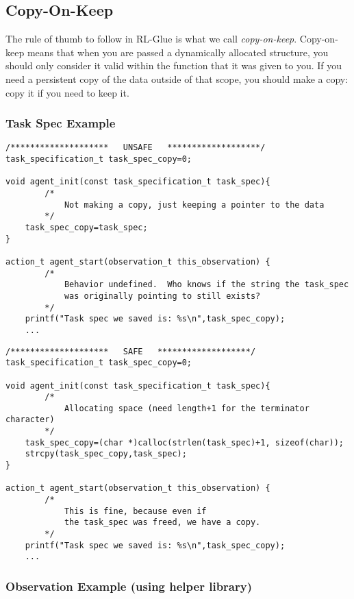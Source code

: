 \documentclass[11pt]{article}
\begin{document}
\subsection{Copy-On-Keep}
The rule of thumb to follow in RL-Glue is what we call \textit{copy-on-keep}.  Copy-on-keep means that when you are passed a dynamically allocated structure, you should
only consider it valid within the function that it was given to you.  If you need a persistent copy of the data outside of that scope, you should make a copy: copy it if you
need to keep it.

\subsubsection{Task Spec Example}
\begin{verbatim}
/********************   UNSAFE   *******************/
task_specification_t task_spec_copy=0;
	
void agent_init(const task_specification_t task_spec){
        /*
            Not making a copy, just keeping a pointer to the data 
        */
    task_spec_copy=task_spec;
}

action_t agent_start(observation_t this_observation) {
        /*
            Behavior undefined.  Who knows if the string the task_spec
            was originally pointing to still exists?
        */
    printf("Task spec we saved is: %s\n",task_spec_copy);
    ...
\end{verbatim}

\begin{verbatim}
/********************   SAFE   *******************/
task_specification_t task_spec_copy=0;
	
void agent_init(const task_specification_t task_spec){
        /*
            Allocating space (need length+1 for the terminator character)
        */
    task_spec_copy=(char *)calloc(strlen(task_spec)+1, sizeof(char));
    strcpy(task_spec_copy,task_spec);
}

action_t agent_start(observation_t this_observation) {
        /*
            This is fine, because even if 
            the task_spec was freed, we have a copy.
        */
    printf("Task spec we saved is: %s\n",task_spec_copy);
    ...
\end{verbatim}


\subsubsection{Observation Example (using helper library)}
\end{document}
